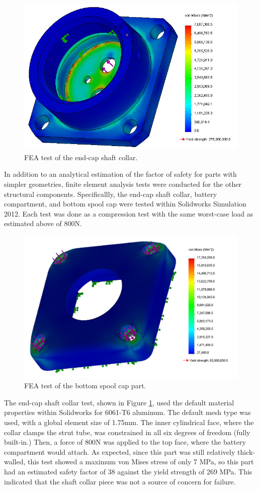 \documentclass[12pt]{report}
\begin{document}
\begin{figure}
   \centering
   \includegraphics[width=0.4\columnwidth]{img/endcap_shaft_collar_compression_test_800N_edited.jpg} 
   \caption{FEA test of the end-cap shaft collar.}
   \label{endcap_shaft_collar_FEA}
\end{figure}

In addition to an analytical estimation of the factor of safety for parts with simpler geometries, finite element analysis tests were conducted for the other structural components.
Specificallly, the end-cap shaft collar, battery compartment, and bottom spool cap were tested within Solidworks Simulation 2012.
Each test was done as a compression test with the same worst-case load as estimated above of 800N.

\begin{figure}
   \centering
   \includegraphics[width=0.4\columnwidth]{img/bottom_spool_cap_compression_test_edited.jpg} 
   \caption{FEA test of the bottom spool cap part.}
   \label{bottom_spool_cap_100N}
\end{figure}

The end-cap shaft collar test, shown in Figure \ref{endcap_shaft_collar_FEA}, used the default material properties within Solidworks for 6061-T6 aluminum.
The default mesh type was used, with a global element size of 1.75mm.
The inner cylindrical face, where the collar clamps the strut tube, was constrained in all six degrees of freedom (fully built-in.)
Then, a force of 800N was applied to the top face, where the battery compartment would attach.
As expected, since this part was still relatively thick-walled, this test showed a maximum von Mises stress of only 7 MPa, so this part had an estimated safety factor of 38 against the yield strength of 269 MPa.
This indicated that the shaft collar piece was not a source of concern for failure.
\end{document}
